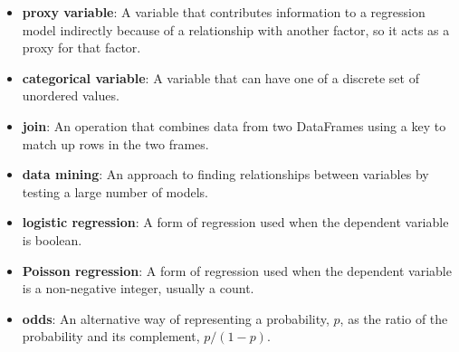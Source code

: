 \begin{itemize}
	\item {\bf proxy variable}: A variable that contributes information to
	a regression model indirectly because of a relationship with another
	factor, so it acts as a proxy for that factor.
	
	\item {\bf categorical variable}: A variable that can have one of a
	discrete set of unordered values.
	
	\item {\bf join}: An operation that combines data from two DataFrames
	using a key to match up rows in the two frames.
	
	\item {\bf data mining}: An approach to finding relationships between
	variables by testing a large number of models.
	
	\item {\bf logistic regression}: A form of regression used when the
	dependent variable is boolean.
	
	\item {\bf Poisson regression}: A form of regression used when the
	dependent variable is a non-negative integer, usually a count.
	
	\item {\bf odds}: An alternative way of representing a probability, $p$, as
	the ratio of the probability and its complement, $p / (1-p)$.
	
\end{itemize}



